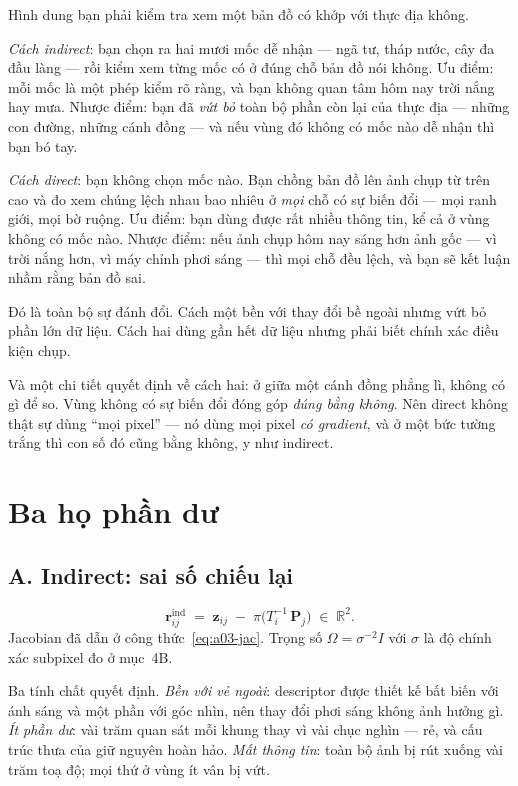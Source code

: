 \documentclass[../../vslam.tex]{subfiles}
\begin{document}
\begin{trucgiac}
Hình dung bạn phải kiểm tra xem một bản đồ có khớp với thực địa không.

\emph{Cách indirect}: bạn chọn ra hai mươi mốc dễ nhận --- ngã tư, tháp nước, cây đa đầu làng --- rồi kiểm xem từng mốc có ở đúng chỗ bản đồ nói không. Ưu điểm: mỗi mốc là một phép kiểm rõ ràng, và bạn không quan tâm hôm nay trời nắng hay mưa. Nhược điểm: bạn đã \emph{vứt bỏ} toàn bộ phần còn lại của thực địa --- những con đường, những cánh đồng --- và nếu vùng đó không có mốc nào dễ nhận thì bạn bó tay.

\emph{Cách direct}: bạn không chọn mốc nào. Bạn chồng bản đồ lên ảnh chụp từ trên cao và đo xem chúng lệch nhau bao nhiêu ở \emph{mọi} chỗ có sự biến đổi --- mọi ranh giới, mọi bờ ruộng. Ưu điểm: bạn dùng được rất nhiều thông tin, kể cả ở vùng không có mốc nào. Nhược điểm: nếu ảnh chụp hôm nay sáng hơn ảnh gốc --- vì trời nắng hơn, vì máy chỉnh phơi sáng --- thì mọi chỗ đều lệch, và bạn sẽ kết luận nhầm rằng bản đồ sai.

Đó là toàn bộ sự đánh đổi. Cách một bền với thay đổi bề ngoài nhưng vứt bỏ phần lớn dữ liệu. Cách hai dùng gần hết dữ liệu nhưng phải biết chính xác điều kiện chụp.

Và một chi tiết quyết định về cách hai: ở giữa một cánh đồng phẳng lì, không có gì để so. Vùng không có sự biến đổi đóng góp \emph{đúng bằng không}. Nên direct không thật sự dùng ``mọi pixel'' --- nó dùng mọi pixel \emph{có gradient}, và ở một bức tường trắng thì con số đó cũng bằng không, y như indirect.
\end{trucgiac}

\section{Ba họ phần dư}

\subsection{A. Indirect: sai số chiếu lại}

\[
\mathbf{r}^{\text{ind}}_{ij} \;=\; \mathbf{z}_{ij} \;-\; \pi\bigl(T_i^{-1}\,\mathbf{P}_j\bigr) \;\in\; \mathbb{R}^2 .
\]
Jacobian đã dẫn ở  công thức~\eqref{eq:a03-jac}. Trọng số \(\Omega = \sigma^{-2}I\) với \(\sigma\) là độ chính xác subpixel đo ở  mục~4B.

Ba tính chất quyết định. \emph{Bền với vẻ ngoài}: descriptor được thiết kế bất biến với ánh sáng và một phần với góc nhìn, nên thay đổi phơi sáng không ảnh hưởng gì. \emph{Ít phần dư}: vài trăm quan sát mỗi khung thay vì vài chục nghìn --- rẻ, và cấu trúc thưa của  giữ nguyên hoàn hảo. \emph{Mất thông tin}: toàn bộ ảnh bị rút xuống vài trăm toạ độ; mọi thứ ở vùng ít vân bị vứt.
\end{document}
